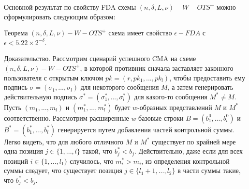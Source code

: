 \documentclass[a4paper, 14pt]{extarticle}
\begin{document}
Основной результат по свойству FDA схемы $(n, \delta, L, \nu)-W-OTS^{+}$ можно сформулировать следующим образом:

Теорема $(n, \delta, L, \nu)-W-OTS^{+}$ схема имеет свойство $\epsilon-FDA$ с $\epsilon < 5.22 \times 2^{-\delta}$.

Доказательство. Рассмотрим сценарий успешного CMA на схеме $(n, \delta, L, \nu)-W-OTS^{+}$, в которой противник сначала заставляет законного пользователя с открытым ключом $pk = (r, pk_{1}, ..., pk_{l})$, чтобы предоставить ему подпись $\sigma = (\sigma_{1}, ..., \sigma_{l})$ для некоторого сообщения $M$, а затем генерировать действительную подпись $\sigma^{*} = (\sigma^{*}_{1}, ..., \sigma^{*}_{l})$ для какого-то сообщения $M^{*} \neq M$. Пусть $(m_{1}, ..., m_{l})$ и $(m^{*}_{1}, ..., m^{*}_{l})$ будет $w$-образных представлений $M$ и $M^{*}$ соответственно. Рассмотрим расширенные $w$-базовые строки $B = (b^{0}_{1}, ..., b^{0}_{l})$ и $B^{*} = (b^{*}_{1}, ..., b^{*}_{l})$ генерируется путем добавления частей контрольной суммы. Легко видеть, что для любого отличного $M$ и $M^{*}$ существует по крайней мере одна позиция $j \in \{1, ..., l\}$ такой, что $b^{*}_{j} < b_{j}$. Действительно, даже если для всех позиций $i \in \{1, ..., l_{1}\}$ случилось, что $m^{*}_{i} > m_{i}$, из определения контрольной суммы следует, что существует позиция $j \in \{l_{1} + 1, ..., l_{2}\}$ в части суммы такие, что $b^{*}_{j} < b_{j}$.
\end{document}
